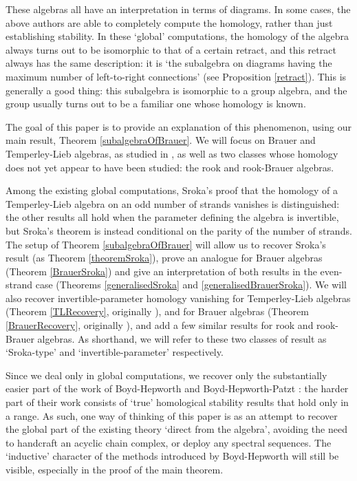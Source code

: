 \documentclass[12pt]{amsart}
\theoremstyle{plain}
\theoremstyle{definition} \newtheorem{definition}[theorem]{Definition}
\theoremstyle{plain}
\theoremstyle{plain} \newtheorem{proposition}[theorem]{Proposition}
\theoremstyle{plain} \newtheorem{conjecture}[theorem]{Conjecture}
\theoremstyle{plain} \newtheorem{corollary}[theorem]{Corollary}
\theoremstyle{remark} \newtheorem{claim}[theorem]{Claim}
\theoremstyle{remark} \newtheorem{remark}[theorem]{Remark}
\theoremstyle{remark} \newtheorem{example}[theorem]{Example}
\theoremstyle{remark} \newtheorem{comment}[theorem]{Comment}
\theoremstyle{definition} \newtheorem{question}[theorem]{Question}
\begin{document}
These algebras all have an interpretation in terms of diagrams. In some cases, the above authors are able to completely compute the homology, rather than just establishing stability. In these `global' computations, the homology of the algebra always turns out to be isomorphic to that of a certain retract, and this retract always has the same description: it is `the subalgebra on diagrams having the maximum number of left-to-right connections' (see Proposition \ref{retract}). This is generally a good thing: this subalgebra is isomorphic to a group algebra, and the group usually turns out to be a familiar one whose homology is known.

The goal of this paper is to provide an explanation of this phenomenon, using our main result, Theorem \ref{subalgebraOfBrauer}. We will focus on Brauer and Temperley-Lieb algebras, as studied in \cite{BH,BHP,Sroka}, as well as two classes whose homology does not yet appear to have been studied: the rook and rook-Brauer algebras.

Among the existing global computations, Sroka's proof that the homology of a Temperley-Lieb algebra on an odd number of strands vanishes \cite{Sroka} is distinguished: the other results all hold when the parameter defining the algebra is invertible, but Sroka's theorem is instead conditional on the parity of the number of strands. The setup of Theorem \ref{subalgebraOfBrauer} will allow us to recover Sroka's result (as Theorem \ref{theoremSroka}), prove an analogue for Brauer algebras (Theorem \ref{BrauerSroka}) and give an interpretation of both results in the even-strand case (Theorems \ref{generalisedSroka} and \ref{generalisedBrauerSroka}). We will also recover invertible-parameter homology vanishing for Temperley-Lieb algebras (Theorem \ref{TLRecovery}, originally \cite{BH}), and for Brauer algebras (Theorem \ref{BrauerRecovery}, originally \cite{BHP}), and add a few similar results for rook and rook-Brauer algebras. As shorthand, we will refer to these two classes of result as `Sroka-type' and `invertible-parameter' respectively.

Since we deal only in global computations, we recover only the substantially easier part of the work of Boyd-Hepworth \cite{BH} and Boyd-Hepworth-Patzt \cite{BHP}: the harder part of their work consists of `true' homological stability results that hold only in a range. As such, one way of thinking of this paper is as an attempt to recover the global part of the existing theory `direct from the algebra', avoiding the need to handcraft an acyclic chain complex, or deploy any spectral sequences. The `inductive' character of the methods introduced by Boyd-Hepworth will still be visible, especially in the proof of the main theorem.
\end{document}
